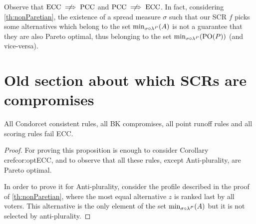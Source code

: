 \documentclass[version=3.21, pagesize, twoside=off, bibliography=totoc, DIV=calc, fontsize=12pt, a4paper]{scrartcl}
\begin{document}
\begin{remark}
	Observe that $\text{ECC} \centernot \implies \text{PCC}$ and $\text{PCC} \centernot \implies \text{ECC}$.
	In fact, considering \cref{th:nonParetian}, the existence of a spread measure $\sigma$ such that our SCR $f$ picks some alternatives which belong to the set $\musigma$ is not a guarantee that they are also Pareto optimal, thus belonging to the set $\mustar$ (and vice-versa).
\end{remark}

\section{Old section about which SCRs are compromises}
\begin{proposition}
	All Condorcet consistent rules, all BK compromises, all point runoff rules and all scoring rules fail ECC.
\end{proposition}
\begin{proof}
	For proving this proposition is enough to consider Corollary cref{cor:optECC}, and to observe that all these rules, except Anti-plurality, are Pareto optimal.
	
	In order to prove it for Anti-plurality, consider the profile described in the proof of \cref{th:nonParetian}, where the most equal alternative $z$ is ranked last by all voters. This alternative is the only element of the set $\musigma$ but it is not selected by anti-plurality. %
\end{proof}
\end{document}
